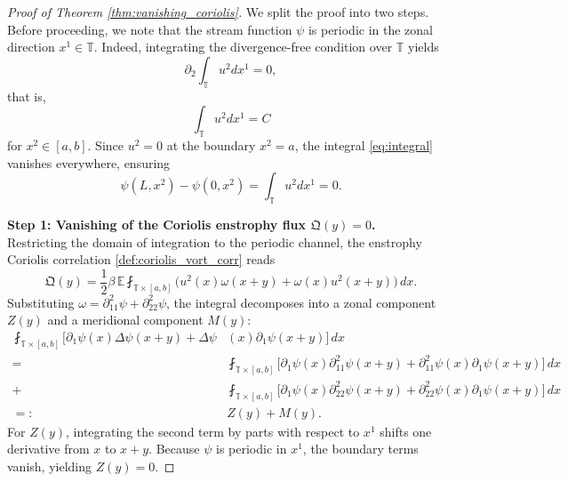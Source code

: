 \documentclass[11pt,a4paper]{article}
\numberwithin{equation}{section}
\numberwithin{theorem}{section}
\numberwithin{remark}{section}
\numberwithin{definition}{section}
\begin{document}
\begin{proof}[Proof of Theorem \ref{thm:vanishing_coriolis}]
We split the proof into two steps. 
Before proceeding, we note that the stream function $\psi$ is periodic in the zonal direction $x^1 \in \mathbb{T}$. Indeed, integrating the divergence-free condition over $\mathbb{T}$ yields
\begin{equation}
    \partial_2 \int_{\mathbb{T}} u^2 dx^1 = 0,
\end{equation}
that is,
\begin{equation}\label{eq:integral}
    \int_{\mathbb{T}} u^2 dx^1 = C
\end{equation}
for $x^2\in[a,b]$. Since $u^2 = 0$ at the boundary $x^2=a$, the integral \eqref{eq:integral} vanishes everywhere, ensuring
\begin{equation}
    \psi(L, x^2) - \psi(0, x^2) = \int_{\mathbb{T}} u^2 dx^1 = 0.
\end{equation}

\noindent\textbf{Step 1: Vanishing of the Coriolis enstrophy flux $\mathfrak{Q}(y)=0$.}\\
Restricting the domain of integration to the periodic channel, the enstrophy Coriolis correlation \eqref{def:coriolis_vort_corr} reads 
\begin{equation}\label{eq:Q_restricted}
    \mathfrak{Q}(y) = \frac{1}{2}\beta \, \mathbb{E} \fint_{\mathbb{T} \times [a, b]} \big( u^2(x) \omega(x+y) + \omega(x) u^2(x+y) \big) \, dx.
\end{equation}
Substituting $\omega = \partial_{11}^2 \psi + \partial_{22}^2 \psi$, the integral decomposes into a zonal component $Z(y)$ and a meridional component $M(y)$:
\begin{align*}
    \fint_{\mathbb{T} \times [a, b]} \big[ \partial_1 \psi(x) \Delta \psi(x+y) + \Delta \psi&(x) \partial_1 \psi(x+y) \big] \, dx\\
    =&\fint_{\mathbb{T} \times [a, b]} \big[ \partial_1 \psi(x) \partial_{11}^2 \psi(x+y) + \partial_{11}^2 \psi(x) \partial_1 \psi(x+y) \big] \, dx\\
    +&\fint_{\mathbb{T} \times [a, b]} \big[ \partial_1 \psi(x) \partial_{22}^2 \psi(x+y) + \partial_{22}^2 \psi(x) \partial_1 \psi(x+y) \big] \, dx\\
    =: &Z(y) + M(y).
\end{align*}
For $Z(y)$, integrating the second term by parts with respect to $x^1$ shifts one derivative from $x$ to $x+y$. Because $\psi$ is periodic in $x^1$, the boundary terms vanish, yielding $Z(y) = 0$.


\end{proof}
\end{document}
